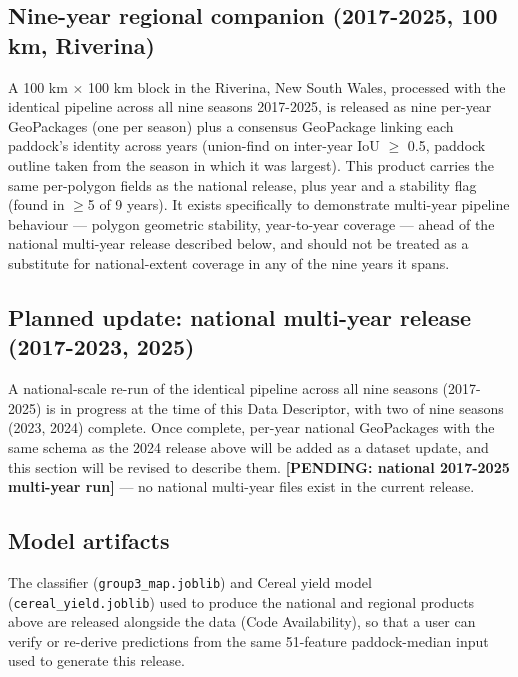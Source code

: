 \subsection*{Nine-year regional companion (2017-2025, 100 km, Riverina)}\label{nine-year-regional-companion-2017-2025-100-km-riverina}

A 100 km $\times$ 100 km block in the Riverina, New South Wales, processed with the identical pipeline across all nine seasons 2017-2025, is released as nine per-year GeoPackages (one per season) plus a consensus GeoPackage linking each paddock's identity across years (union-find on inter-year IoU $\geq$ 0.5, paddock outline taken from the season in which it was largest). This product carries the same per-polygon fields as the national release, plus year and a stability flag (found in $\geq$5 of 9 years). It exists specifically to demonstrate multi-year pipeline behaviour --- polygon geometric stability, year-to-year coverage --- ahead of the national multi-year release described below, and should not be treated as a substitute for national-extent coverage in any of the nine years it spans.

\subsection*{Planned update: national multi-year release (2017-2023, 2025)}\label{planned-update-national-multi-year-release-2017-2023-2025}

A national-scale re-run of the identical pipeline across all nine seasons (2017-2025) is in progress at the time of this Data Descriptor, with two of nine seasons (2023, 2024) complete. Once complete, per-year national GeoPackages with the same schema as the 2024 release above will be added as a dataset update, and this section will be revised to describe them. \textbf{{[}PENDING: national 2017-2025 multi-year run{]}} --- no national multi-year files exist in the current release.

\subsection*{Model artifacts}\label{model-artifacts}

The classifier (\texttt{group3\_map.joblib}) and Cereal yield model (\texttt{cereal\_yield.joblib}) used to produce the national and regional products above are released alongside the data (Code Availability), so that a user can verify or re-derive predictions from the same 51-feature paddock-median input used to generate this release.

